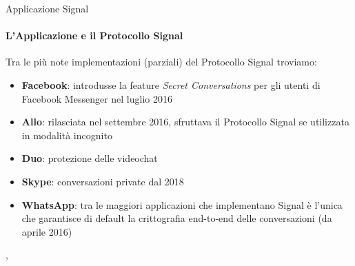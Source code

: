 \begin{frame}{Applicazione Signal}
    \framesubtitle{L'Applicazione e il Protocollo Signal}
    Tra le più note implementazioni (parziali) del Protocollo Signal troviamo:\pause
    \begin{itemize}
        \item <1-> \textbf{Facebook}: introdusse la feature \textit{Secret Conversations} per gli utenti di Facebook Messenger nel luglio 2016\pause
        \item <2-> \textbf{Allo}: rilasciata nel settembre 2016, sfruttava il Protocollo Signal se utilizzata in modalità incognito\pause
        \item <3-> \textbf{Duo}: protezione delle videochat\pause
        \item <4-> \textbf{Skype}: conversazioni private dal 2018\pause
        \item <5-> \textbf{WhatsApp}: tra le maggiori applicazioni che implementano Signal è l’unica che garantisce di default la crittografia end-to-end delle conversazioni (da aprile 2016)
    \end{itemize}
    
    \cite{greenberg}, \cite{Lumb}
    
\end{frame}

